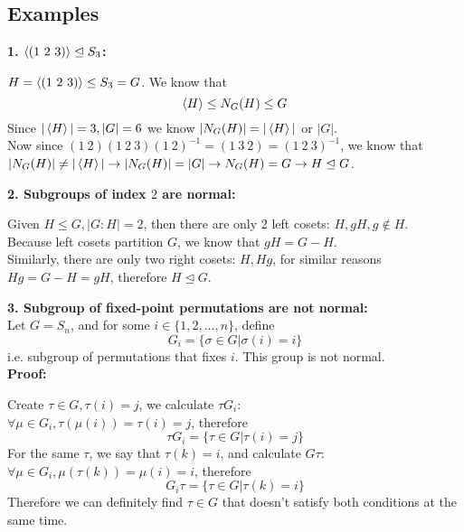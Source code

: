 \documentclass{article}
\begin{document}
\subsection{Examples}
\textbf{1. $\braket{(1\ 2\ 3)} \trianglelefteq S_3$:}
\begin{addmargin}[1em]{0em}
$H = \braket{(1\ 2\ 3)} \leq S_3 = G$. We know that
\begin{equation*}
    \braket{H} \leq N_G(H) \leq G
\end{equation*}
Since $|\braket{H}| = 3, |G| = 6$ we know $|N_G(H)| = |\braket{H}|$ or $|G|$.\\
Now since $(1\ 2)(1\ 2\ 3)(1\ 2)^{-1} = (1\ 3\ 2) = (1\ 2\ 3)^{-1}$, we know that $|N_G(H)| \neq |\braket{H}| \rightarrow |N_G(H)| = |G| \rightarrow N_G(H) = G \rightarrow H \trianglelefteq G$.
\end{addmargin}
\textbf{2. Subgroups of index $2$ are normal:}
\begin{addmargin}[1em]{0em}
Given $H \leq G, |G:H| = 2$, then there are only 2 left cosets: $H, gH, g \notin H$.\\
Because left cosets partition $G$, we know that $gH = G - H$.\\
Similarly, there are only two right cosets: $H, Hg$, for similar reasons $Hg = G-H = gH$, therefore $H \trianglelefteq G$.
\end{addmargin}
\textbf{3. Subgroup of fixed-point permutations are not normal:}\\
Let $G = S_n$, and for some $i \in \{1,2, ..., n\}$, define
\begin{equation*}
    G_i = \{\sigma \in G| \sigma(i) = i\}
\end{equation*}
i.e. subgroup of permutations that fixes $i$. This group is not normal.\\
\textbf{Proof:}
\begin{addmargin}[1em]{0em}
Create $\tau \in G, \tau(i) = j$, we calculate $\tau G_i$:\\
$\forall \mu \in G_i, \tau(\mu (i)) = \tau(i) = j$, therefore
\begin{equation*}
    \tau G_i = \{\tau \in G| \tau(i) = j\}
\end{equation*}
For the same $\tau$, we say that $\tau(k) = i$, and calculate $G\tau$:\\
$\forall \mu \in G_i, \mu(\tau(k)) = \mu(i) = i$, therefore
\begin{equation*}
    G_i\tau = \{\tau \in G| \tau(k) = i\}
\end{equation*}
Therefore we can definitely find $\tau \in G$ that doesn't satisfy both conditions at the same time.
\end{addmargin}
\end{document}
